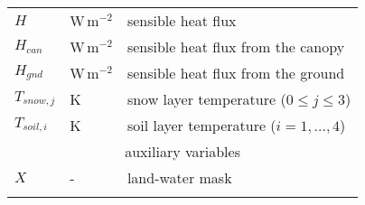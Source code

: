 \begin{table}[t]
\begin{tabular}{lll}
    \(H\)          & W\,m$^{-2}$            & sensible heat flux \\
    \(H_{can}\)    & W\,m$^{-2}$            & sensible heat flux from the canopy \\
    \(H_{gnd}\)    & W\,m$^{-2}$            & sensible heat flux from the ground \\
    \(T_{snow,j}\) & K                      & snow layer temperature (\(0 \leq j \leq 3\)) \\
    \(T_{soil,i}\) & K                      & soil layer temperature (\(i=1,\dots,4\)) \\
    [1pt]
    \multicolumn{3}{c}{auxiliary variables}                                             \\
    \(X\)          & -                      & land-water mask \\
    \bottomhline
  \end{tabular}
\end{table}
